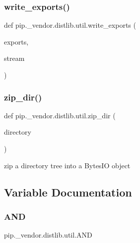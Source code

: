 \subsubsection{\texorpdfstring{write\+\_\+exports()}{write\_exports()}}
{\footnotesize\ttfamily def pip.\+\_\+vendor.\+distlib.\+util.\+write\+\_\+exports (\begin{DoxyParamCaption}\item[{}]{exports,  }\item[{}]{stream }\end{DoxyParamCaption})}

\mbox{\label{namespacepip_1_1__vendor_1_1distlib_1_1util_ade5b92b1fce9b1301a0b7ae5b2ffd2f9}} 
\subsubsection{\texorpdfstring{zip\+\_\+dir()}{zip\_dir()}}
{\footnotesize\ttfamily def pip.\+\_\+vendor.\+distlib.\+util.\+zip\+\_\+dir (\begin{DoxyParamCaption}\item[{}]{directory }\end{DoxyParamCaption})}

\begin{DoxyVerb}zip a directory tree into a BytesIO object\end{DoxyVerb}
 

\subsection{Variable Documentation}
\mbox{\label{namespacepip_1_1__vendor_1_1distlib_1_1util_a2d1155f7fb6a637f9ef84ba0f16c94f2}} 
\subsubsection{\texorpdfstring{A\+ND}{AND}}
{\footnotesize\ttfamily pip.\+\_\+vendor.\+distlib.\+util.\+A\+ND}

